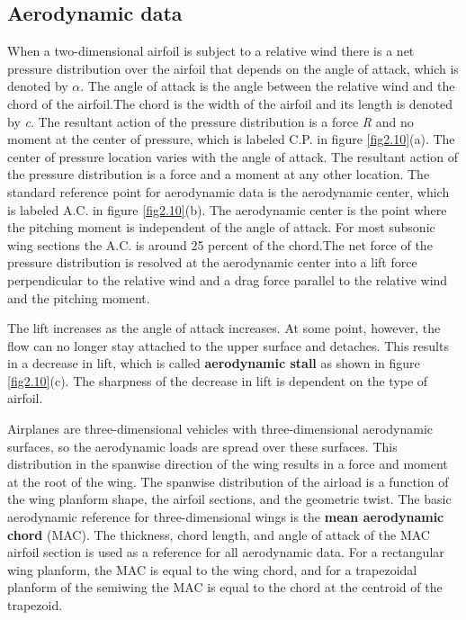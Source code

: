 \documentclass{AeroStructure-ERJohnson}
\begin{document}
\subsection{Aerodynamic data}\label{sec2.4.5}

When a two-dimensional airfoil is subject to a relative wind there is a net pressure distribution over the airfoil that depends on the angle of attack, which is denoted by $\alpha$. The angle of attack is the angle between the relative wind and the chord of the airfoil.The chord is the width of the airfoil and its length is denoted by \textit{c}. The resultant action of the pressure distribution is a force \textit{R} and no moment at the center of pressure, which is labeled C.P. in figure \ref{fig2.10}(a). The center of pressure location varies with the angle of attack. The resultant action of the pressure distribution is a force and a moment at any other location. The standard reference point for aerodynamic data is the aerodynamic center, which is labeled A.C. in figure \ref{fig2.10}(b). The aerodynamic center is the point where the pitching moment is independent of the angle of attack. For most subsonic wing sections the A.C. is around 25 percent of the chord.The net force of the pressure distribution is resolved at the aerodynamic center into a lift force perpendicular to the relative wind and a drag force parallel to the relative wind and the pitching moment.


{\def\thefigure{2.10}
}



The lift increases as the angle of attack increases. At some point, however, the flow can no longer stay attached to the upper surface and detaches. This results in a decrease in lift, which is called \textbf{aerodynamic stall} as shown in figure \ref{fig2.10}(c). The sharpness of the decrease in lift is dependent on the type of airfoil\vadjust{\vfill\pagebreak}.

Airplanes are three-dimensional vehicles with three-dimensional aerodynamic surfaces, so the aerodynamic loads are spread over these surfaces. This distribution in the spanwise direction of the wing results in a force and moment at the root of the wing. The spanwise distribution of the airload is a function of the wing planform shape, the airfoil sections, and the geometric twist. The basic aerodynamic reference for three-dimensional wings is the \textbf{mean aerodynamic chord} (MAC). The thickness, chord length, and angle of attack of the MAC airfoil section is used as a reference for all aerodynamic data. For a rectangular wing planform, the MAC is equal to the wing chord, and for a trapezoidal planform of the semiwing the MAC is equal to the chord at the centroid of the trapezoid.
\end{document}
